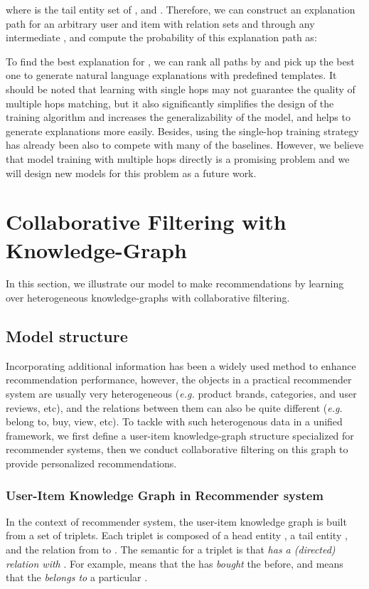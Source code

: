\documentclass[algorithms,article,accept,moreauthors,pdftex,10pt,a4paper]{Definitions/mdpi}
\begin{document}
where  is the tail entity set of , and .
Therefore, we can construct an explanation path for an arbitrary user  and item  with relation sets  and  through any intermediate , and compute the probability of this explanation path as:


To find the best explanation for , we can rank all paths by  and pick up the best one to generate natural language explanations with predefined templates. It should be noted that learning with single hops may not guarantee the quality of multiple hops matching, but it also significantly simplifies the design of the training algorithm and increases the generalizability of the model, and helps to generate explanations more easily. Besides, using the single-hop training strategy has already been also to compete with many of the baselines. However, we believe that model training with multiple hops directly is a promising problem and we will design new models for this problem as a future work.








\iffalse
\section{Collaborative Filtering with Knowledge-Graph}
In this section, we illustrate our model to make recommendations by learning over heterogeneous knowledge-graphs with collaborative filtering. 


\subsection{Model structure}
Incorporating additional information has been a widely used method to enhance recommendation performance, however, the objects in a practical recommender system are usually very heterogeneous (\emph{e.g.} product brands, categories, and user reviews, etc), and the relations between them can also be quite different (\emph{e.g.} belong to, buy, view, etc).
To tackle with such heterogenous data in a unified framework, we first define a user-item knowledge-graph structure specialized for recommender systems, then we conduct collaborative filtering on this graph to provide personalized recommendations.  

\subsubsection{User-Item Knowledge Graph in Recommender system}
In the context of recommender system, the user-item knowledge graph is built from a set of triplets. Each triplet  is composed of a head entity , a tail entity , and the relation  from  to . The semantic for a triplet  is that \emph{ has a (directed) relation  with }. For example,  means that the \emph{} has \emph{bought} the \emph{} before, and  means that the  \textit{belongs to} a particular .
\end{document}
